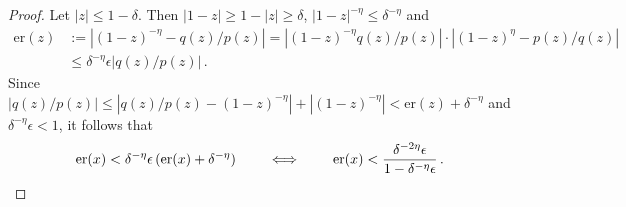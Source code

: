 \documentclass[12pt]{article} %
\newcommand{\abs}[1]{\left| #1 \right|}
\begin{document}
\begin{proof} 
 Let $\abs{z}\leq 1-\delta$. Then  $\abs{1 - z} \geq 1 - \abs{z} \geq \delta$, $\abs{1 - z}^{-\eta} \leq \delta^{-\eta}$  and 
\begin{align*} 
\text{er}(z) &\!:= \abs{(1-z)^{-\eta} - q(z) / p(z)} 
= \abs{(1-z)^{-\eta} q(z) / p(z)} \cdot \abs{(1-z)^{\eta} - p(z) / q(z)} \\ & \leq \delta^{-\eta} \epsilon \big|q(z) / p(z)\big| \, .
\end{align*}
%
 Since $ \abs{q(z) / p(z)} \leq \abs{q(z) / p(z) - (1 - z)^{-\eta}} +  \abs{(1 - z)^{-\eta}} < \text{er}(z) + \delta^{-\eta}$ and $\delta^{-\eta} \epsilon < 1$, it follows that 
%
\begin{equation*}
\text{er}(x) < \delta^{-\eta} \epsilon \, (\text{er}(x) + \delta^{-\eta}) 
% 
\qquad \iff\qquad 
\text{er}(x) < \frac{\delta^{-2 \eta}\epsilon}{1 - \delta^{-\eta} \epsilon} \, . \qedhere
\end{equation*}
\end{proof}
\end{document}
